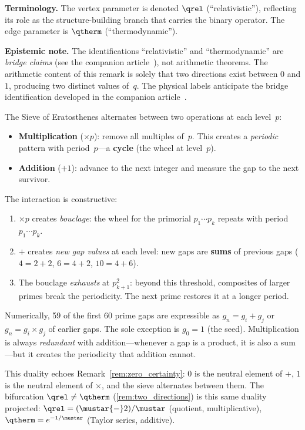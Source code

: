 \documentclass[12pt,a4paper]{article}
\begin{document}
\begin{remark}
\medskip\noindent
\textbf{Terminology.}
The vertex parameter is denoted $\qrel$ (``relativistic''),
reflecting its role as the structure-building branch that carries
the binary operator.  The edge parameter is $\qtherm$
(``thermodynamic'').

\medskip\noindent
\textbf{Epistemic note.}
The identifications ``relativistic'' and ``thermodynamic'' are
\emph{bridge claims} (see the companion article~\cite{companion_M5}), not arithmetic
theorems.  The arithmetic content of this remark is solely that
two directions exist between $0$ and $1$, producing two distinct
values of~$q$.  The physical labels anticipate the bridge
identification developed in the companion article~\cite{companion_M5}.
\end{remark}

\begin{remark}
\label{rem:add_mult_duality}
The Sieve of Eratosthenes alternates between two operations
at each level~$p$:
\begin{itemize}[nosep]
\item \textbf{Multiplication} ($\times p$): remove all multiples of~$p$.
  This creates a \emph{periodic} pattern with period~$p$---a
  \textbf{cycle} (the wheel at level~$p$).
\item \textbf{Addition} ($+1$): advance to the next integer and
  measure the gap to the next survivor.
\end{itemize}

The interaction is constructive:
\begin{enumerate}[nosep]
\item $\times p$ creates \emph{bouclage}: the wheel for the
  primorial $p_1 \cdots p_k$ repeats with period $p_1 \cdots p_k$.
\item $+$ creates \emph{new gap values} at each level:
  new gaps are \textbf{sums} of previous gaps
  ($4 = 2{+}2$, $6 = 4{+}2$, $10 = 4{+}6$).
\item The bouclage \emph{exhausts} at $p_{k+1}^2$: beyond this
  threshold, composites of larger primes break the periodicity.
  The next prime restores it at a longer period.
\end{enumerate}

Numerically, 59 of the first 60 prime gaps are expressible as
$g_n = g_i + g_j$ or $g_n = g_i \times g_j$ of earlier gaps.
The sole exception is $g_0 = 1$ (the seed).  Multiplication
is always \emph{redundant} with addition---whenever a gap is a
product, it is also a sum---but it creates the periodicity that
addition cannot.

This duality echoes Remark~\ref{rem:zero_certainty}:
$0$ is the neutral element of $+$, $1$ is the neutral element
of $\times$, and the sieve alternates between them.
The bifurcation $\qrel \neq \qtherm$
(\cref{rem:two_directions}) is this same duality projected:
$\qrel = (\mustar{-}2)/\mustar$ (quotient, multiplicative),
$\qtherm = e^{-1/\mustar}$ (Taylor series, additive).
\end{remark}
\end{document}

